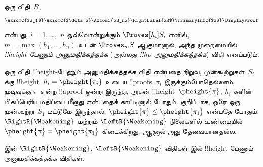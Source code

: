 \documentclass[../../../include/open-logic-section]{subfiles}
\begin{document}
\begin{defn}
ஒரு விதி~$R$,
\[
\AxiomC{$S_1$}
\AxiomC{$\dots$}
\AxiomC{$S_n$}
\RightLabel{$R$}
\TrinaryInfC{$S$}
\DisplayProof
\]
என்பது, $i = 1$, \dots,~$n$ ஒவ்வொன்றுக்கும்
$\Proves[h_i] S_i$ எனில்,
$m = \max(h_1, \dots,
h_n)$ உடன் $\Proves_m S$
ஆகுமானால், அந்த முறைமையில்
\emph{!!{height}-பேணும் அனுமதிக்கத்தக்க}
(அல்லது \emph{!!{hp}-அனுமதிக்கத்தக்க})
விதி எனப்படும்.
\end{defn}

ஒரு விதி !!{height}-பேணும்
அனுமதிக்கத்தக்க விதி என்பதை நிறுவ,
முன்கூற்றுகள்~$S_i$ க்கு
!!{height}~$h_i = \pheight{\pi_i}$
உடைய !!{proof}s~$\pi_i$ இருக்கும்போதெல்லாம்,
முடிவுக்கு $\pi$ என்ற !!a{proof}
ஒன்று இருந்து, அதன்
!!{height}~$\pheight{\pi}$,
$h_i$ களின் மிகப்பெரிய மதிப்பை
மீறாது என்பதைக் காட்டினால் போதும்.
குறிப்பாக, ஒரே ஒரு முன்கூற்று~$S_1$
மட்டுமே இருந்தால்,
$\pheight{\pi} \le \pheight{\pi_1}$
என்பதே போதும்.
$\RightR{\Weakening}$ மற்றும்
$\LeftR{\Weakening}$ நிலைகளில்
உண்மையில் $\pheight{\pi} = \pheight{\pi_1}$
கிடைக்கிறது; ஆனால் அது தேவையானதல்ல.

\begin{prop}
 இன் $\RightR{\Weakening}$,
$\LeftR{\Weakening}$ விதிகள்  இல்
!!{height}-பேணும் அனுமதிக்கத்தக்க விதிகள்.
\end{prop}
\end{document}
